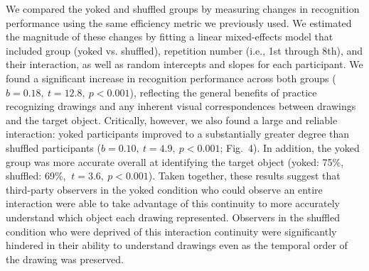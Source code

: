 \documentclass[10pt,letterpaper]{article}
\begin{document}

We compared the yoked and shuffled groups by measuring changes in recognition performance using the same efficiency metric we previously used.
We estimated the magnitude of these changes by fitting a linear mixed-effects model that included group (yoked vs. shuffled), repetition number (i.e., 1st through 8th), and their interaction, as well as random intercepts and slopes for each participant.
We found a significant increase in recognition performance across both groups ($b = 0.18, ~t = 12.8, ~p < 0.001$), reflecting the general benefits of practice recognizing drawings and any inherent visual correspondences between drawings and the target object.  %
Critically, however, we also found a large and reliable interaction: yoked participants improved to a substantially greater degree than shuffled participants ($b = 0.10, ~t = 4.9, ~p<0.001$; Fig.~4).
In addition, the yoked group was more accurate overall at identifying the target object (yoked: 75\%, shuffled: 69\%, $~t = 3.6, ~p < 0.001$). %
Taken together, these results suggest that third-party observers in the yoked condition who could observe an entire interaction were able to take advantage of this continuity to more accurately understand which object each drawing represented.
Observers in the shuffled condition who were deprived of this interaction continuity were significantly hindered in their ability to understand drawings even as the temporal order of the drawing was preserved.



\end{document}
